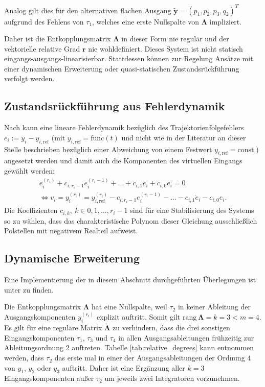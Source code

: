 Analog gilt dies für den alternativen flachen Ausgang $\tilde{\mathbf{y}} = (p_1, p_2, p_3, q_2)^T$ aufgrund des Fehlens von $\tau_1$, welches eine erste Nullspalte von $\boldsymbol{\Lambda}$ impliziert.

Daher ist die Entkopplungsmatrix $\boldsymbol{\Lambda}$ in dieser Form nie regulär und der vektorielle relative Grad $\mathbf{r}$ nie wohldefiniert. Dieses System ist nicht statisch eingangs-ausgangs-linearisierbar. Stattdessen können zur Regelung Ansätze mit einer dynamischen Erweiterung oder quasi-statischen Zustandsrückführung verfolgt werden. 

\subsection{Zustandsrückführung aus Fehlerdynamik}
\label{sec:error_dynamics}
Nach \cite[S. 195]{NLRT_Roebenack} kann eine lineare Fehlerdynamik bezüglich des Trajektorienfolgefehlers $e_i := y_i - y_{i, \text{ref}}$ (mit $y_{i, \text{ref}} = \mathrm{func}(t)$ und nicht wie in der Literatur an dieser Stelle beschrieben bezüglich einer Abweichung von einem Festwert $y_{i, \text{ref}} = \mathrm{const.}$) angesetzt werden und damit auch die Komponenten des virtuellen Eingangs gewählt werden:
\begin{align}
	e_i^{(r_i)} + c_{i, r_i-1} e_i^{(r_i-1)} + ... + c_{i, 1} \dot{e}_i + c_{i, 0} e_i = 0 
	\\
	\Leftrightarrow v_i = y_i^{(r_i)} = y_{i, \text{ref}}^{(r_i)} - c_{i, r_i-1} e_i^{(r_i-1)} - ... - c_{i, 1} \dot{e}_i - c_{i, 0} e_i.
\end{align}
Die Koeffizienten $c_{i, k}, \ k \in {0, 1, ..., r_i-1}$ sind für eine Stabilisierung des Systems so zu wählen, dass das charakteristische Polynom dieser Gleichung ausschließlich Polstellen mit negativem Realteil aufweist.

\subsection{Dynamische Erweiterung}
\label{sec_dynamic_extension_control}
Eine Implementierung der in diesem Abschnitt durchgeführten Überlegungen ist unter \cite[flatness\_notebooks/ODE\_flatness\_trajectory\_control\_simulation\_dyn.ipynb]{SAGithub} zu finden.

Die Entkopplungsmatrix $\boldsymbol{\Lambda}$ hat eine Nullspalte, weil $\tau_2$ in keiner Ableitung der Ausgangskomponenten $y_i^{(r_i)}$ explizit auftritt. Somit gilt $\text{rang} \ \boldsymbol{\Lambda} = k = 3 < m = 4$. Es gilt für eine reguläre Matrix $\tilde{\boldsymbol{\Lambda}}$ zu verhindern, dass die drei sonstigen Eingangskomponenten $\tau_1$, $\tau_3$ und $\tau_4$ in allen Ausgangsableitungen frühzeitig zur Ableitungsordnung 2 auftreten. Tabelle \ref{tab:relative_degrees} kann entnommen werden, dass $\tau_{2}$ das erste mal in einer der Ausgangsableitungen der Ordnung 4 von $y_1$, $y_2$ oder $y_3$ auftritt. Daher ist eine Ergänzung aller $k = 3$ Eingangskomponenten außer $\tau_2$ um jeweils zwei Integratoren vorzunehmen. \cite[S. 200]{NLRT_Roebenack}

